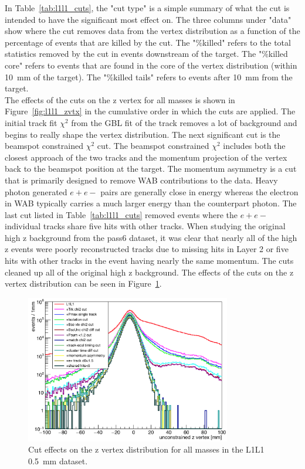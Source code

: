 In Table~\ref{tab:l1l1_cuts}, the "cut type" is a simple summary of what the cut is intended to have the significant most effect on. The three columns under "data" show where the cut removes data from the vertex distribution as a function of the percentage of events that are killed by the cut. The "$\%$killed" refers to the total statistics removed by the cut in events downstream of the target. The "$\%$killed core" refers to events that are found in the core of the vertex distribution (within 10~mm of the target). The "$\%$killed tails" refers to events after 10~mm from the target. \\
\indent The effects of the cuts on the z vertex for all masses is shown in Figure~\ref{fig:l1l1_zvtx} in the cumulative order in which the cuts are applied. The initial track fit $\chi^{2}$ from the GBL fit of the track removes a lot of background and begins to really shape the vertex distribution. The next significant cut is the beamspot constrained $\chi^{2}$ cut. The beamspot constrained $\chi^{2}$ includes both the closest approach of the two tracks and the momentum projection of the vertex back to the beamspot position at the target. The momentum asymmetry is a cut that is primarily designed to remove WAB contributions to the data. Heavy photon generated $e+e-$ pairs are generally close in energy whereas the electron in WAB typically carries a much larger energy than the counterpart photon. 
\indent The last cut listed in Table~\ref{tab:l1l1_cuts} removed events where the $e+e-$ individual tracks share five hits with other tracks. When studying the original high z background from the pass6 dataset, it was clear that nearly all of the high z events were poorly reconstructed tracks due to missing hits in Layer 2 or five hits with other tracks in the event having nearly the same momentum. The cuts cleaned up all of the original high z background. The effects of the cuts on the z vertex distribution can be seen in Figure~\ref{fig:l1l1_vtx}.

\begin{figure}[H]
  \centering
      \includegraphics[width=0.8\textwidth]{plots/L1L1_zvtx.png}
  \caption{Cut effects on the z vertex distribution for all masses in the L1L1 0.5~mm dataset.}
  \label{fig:l1l1_vtx}
\end{figure} 

